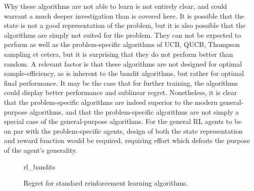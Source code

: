 Why these algorithms are not able to learn is not entirely clear, and could warrant a much deeper investigation than is covered here.
It is possible that the state is not a good representation of the problem, but it is also possible that the algorithms are simply not suited for the problem.
They can not be expected to perform as well as the problem-specific algorithms of UCB, QUCB, Thompson sampling et cetera, but it is surprising that they do not perform better than random.
A relevant factor is that these algorithms are not designed for optimal sample-efficiency, as is inherent to the bandit algorithms, but rather for optimal final performance.
It may be the case that for further training, the algorithms could display better performance and sublinear regret.
Nonetheless, it is clear that the problem-specific algorithms are indeed superior to the modern general-purpose algorithms, and that the problem-specific algorithms are not simply a special case of the general-purpose algorithms.
For the general RL agents to be on par with the problem-specific agents, design of both the state representation and reward function would be required, requiring effort which defeats the purpose of the agent's generality.

\begin{figure}
    \centering
    \newcommand{\myoptions}{
        width=10cm,
        height=8cm,
        xlabel={Turn},
        ylabel={Regret},
        legend entries={A2C, DQN, PPO, QNN},
        legend pos=north west,
        legend cell align=left,
        mystyle,
        largexnumbers,
    }
    {rl_bandits}
    \caption{
        Regret for standard reinforcement learning algorithms.
    }
    \label{fig:rl_bandits}
\end{figure}